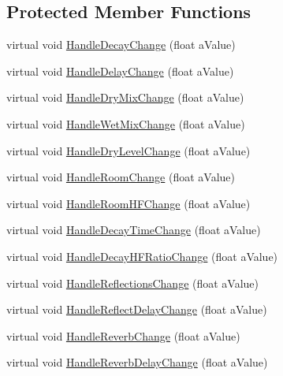 \subsection*{Protected Member Functions}
\begin{DoxyCompactItemize}
\item 
virtual void \hyperlink{class_a_t_i_1_1_audio_effect_handler_ae8a88211ac0910dc4b7752667abb2f84}{Handle\+Decay\+Change} (float a\+Value)
\item 
virtual void \hyperlink{class_a_t_i_1_1_audio_effect_handler_a5371fca4c2e86cecfc264dfc7559b6bd}{Handle\+Delay\+Change} (float a\+Value)
\item 
virtual void \hyperlink{class_a_t_i_1_1_audio_effect_handler_a8d83371e2e982373b4eb04198a8514fb}{Handle\+Dry\+Mix\+Change} (float a\+Value)
\item 
virtual void \hyperlink{class_a_t_i_1_1_audio_effect_handler_a630d6f0e674c531ad0c138181609a895}{Handle\+Wet\+Mix\+Change} (float a\+Value)
\item 
virtual void \hyperlink{class_a_t_i_1_1_audio_effect_handler_abf6b4a6ead7e60bbaea15f94936c316e}{Handle\+Dry\+Level\+Change} (float a\+Value)
\item 
virtual void \hyperlink{class_a_t_i_1_1_audio_effect_handler_a416ae6f8266224b0d6cd71cba1020001}{Handle\+Room\+Change} (float a\+Value)
\item 
virtual void \hyperlink{class_a_t_i_1_1_audio_effect_handler_af3f3b123b89b6e53dce5a7c22190f5b6}{Handle\+Room\+H\+F\+Change} (float a\+Value)
\item 
virtual void \hyperlink{class_a_t_i_1_1_audio_effect_handler_a35173ee088bc2459907af3521bcd69ac}{Handle\+Decay\+Time\+Change} (float a\+Value)
\item 
virtual void \hyperlink{class_a_t_i_1_1_audio_effect_handler_af00cbc35b44d68de0d2d0497e1defa3a}{Handle\+Decay\+H\+F\+Ratio\+Change} (float a\+Value)
\item 
virtual void \hyperlink{class_a_t_i_1_1_audio_effect_handler_af50ba52dba236a3b711172fd6bbc1bab}{Handle\+Reflections\+Change} (float a\+Value)
\item 
virtual void \hyperlink{class_a_t_i_1_1_audio_effect_handler_ada336ed04fdb3360de3026ba8659c409}{Handle\+Reflect\+Delay\+Change} (float a\+Value)
\item 
virtual void \hyperlink{class_a_t_i_1_1_audio_effect_handler_aee7aa84aa7d433a7f7264aff131d5a6a}{Handle\+Reverb\+Change} (float a\+Value)
\item 
virtual void \hyperlink{class_a_t_i_1_1_audio_effect_handler_a03f47bb2ac36fc9c672ccddd76af6e6a}{Handle\+Reverb\+Delay\+Change} (float a\+Value)

\end{DoxyCompactItemize}
